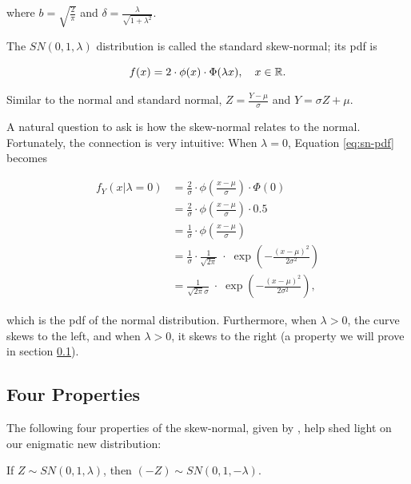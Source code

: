 \documentclass{article}
\begin{document}
where $b = \sqrt{\frac{2}{\pi}}$ and $\delta = \frac{\lambda}{\sqrt{1 +
\lambda^2}}$.

The $SN(0,1,\lambda)$ distribution is called the standard skew-normal; its pdf
is

\begin{equation} \label{eq:standard-sn-pdf}
  f(x) = 2 \cdot \phi(x) \cdot \Phi (\lambda x), \quad x \in \mathbb{R}.
\end{equation}

Similar to the normal and standard normal, $Z = \frac{Y - \mu}{\sigma}$ and $Y
= \sigma Z + \mu$.

A natural question to ask is how the skew-normal relates to the normal.
Fortunately, the connection is very intuitive: When $\lambda = 0$, Equation
\eqref{eq:sn-pdf} becomes

\begin{align*}
  f_Y(x|\lambda=0) &= \frac2\sigma \cdot \phi \left( \frac{x-\mu}{\sigma} \right) \cdot \Phi(0) \\
  &= \frac2\sigma \cdot \phi \left( \frac{x-\mu}{\sigma} \right) \cdot 0.5 \\
  &= \frac1\sigma \cdot \phi \left( \frac{x-\mu}{\sigma} \right) \\
  &= \frac1\sigma \cdot \frac{1}{\sqrt{2\pi}} \;\cdot\; \exp \left( -\frac{(x-\mu)^2}{2\sigma^2} \right) \\
  &= \frac{1}{\sqrt{2\pi}\sigma} \;\cdot\; \exp \left( -\frac{(x-\mu)^2}{2\sigma^2} \right),
\end{align*}

which is the pdf of the normal distribution. Furthermore, when $\lambda > 0$,
the curve skews to the left, and when $\lambda > 0$, it skews to the right (a
property we will prove in section \ref{subsec:four-properties}).

\subsection{Four Properties}
\label{subsec:four-properties}

The following four properties of the skew-normal, given by \citet{main}, help
shed light on our enigmatic new distribution:

\begin{property} \label{prop:1}
  If $Z \sim SN(0, 1, \lambda)$, then $(-Z) \sim SN(0, 1, -\lambda)$.
\end{property}
\end{document}
